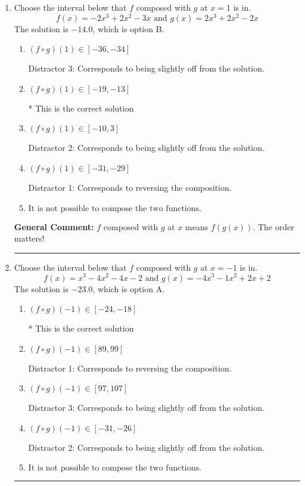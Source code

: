 \documentclass{extbook}[14pt]
\newcommand{\litem}[1]{\item #1

\rule{\textwidth}{0.4pt}}
\begin{document}
\begin{enumerate}\litem{
Choose the interval below that $f$ composed with $g$ at $x=1$ is in.
\[ f(x) = -2x^{3} +2 x^{2} -3 x \text{ and } g(x) = 2x^{3} +2 x^{2} -2 x \]The solution is \( -14.0 \), which is option B.\begin{enumerate}[label=\Alph*.]
\item \( (f \circ g)(1) \in [-36, -34] \)

 Distractor 3: Corresponds to being slightly off from the solution.
\item \( (f \circ g)(1) \in [-19, -13] \)

* This is the correct solution
\item \( (f \circ g)(1) \in [-10, 3] \)

 Distractor 2: Corresponds to being slightly off from the solution.
\item \( (f \circ g)(1) \in [-31, -29] \)

 Distractor 1: Corresponds to reversing the composition.
\item \( \text{It is not possible to compose the two functions.} \)


\end{enumerate}

\textbf{General Comment:} $f$ composed with $g$ at $x$ means $f(g(x))$. The order matters!
}
\litem{
Choose the interval below that $f$ composed with $g$ at $x=-1$ is in.
\[ f(x) = x^{3} -4 x^{2} -4 x -2 \text{ and } g(x) = -4x^{3} -1 x^{2} +2 x + 2 \]The solution is \( -23.0 \), which is option A.\begin{enumerate}[label=\Alph*.]
\item \( (f \circ g)(-1) \in [-24, -18] \)

* This is the correct solution
\item \( (f \circ g)(-1) \in [89, 99] \)

 Distractor 1: Corresponds to reversing the composition.
\item \( (f \circ g)(-1) \in [97, 107] \)

 Distractor 3: Corresponds to being slightly off from the solution.
\item \( (f \circ g)(-1) \in [-31, -26] \)

 Distractor 2: Corresponds to being slightly off from the solution.
\item \( \text{It is not possible to compose the two functions.} \)


\end{enumerate}

}
\end{enumerate}
\end{document}
